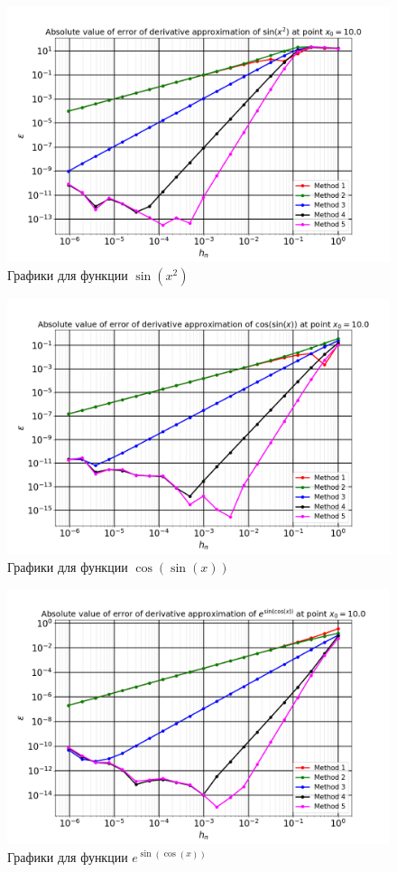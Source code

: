 		\begin{figure}[h!]
			\centering
			\includegraphics[width=\linewidth]{./Pictures/Function_1.png}
			\caption{Графики для функции $\sin(x^2)$}
		\end{figure}
	
		\newpage
		\begin{figure}[h!]
			\centering
			\includegraphics[width=\linewidth]{./Pictures/Function_2.png}
			\caption{Графики для функции $\cos(\sin(x))$}
		\end{figure}
	
		\begin{figure}[h!]
			\centering
			\includegraphics[width=\linewidth]{./Pictures/Function_3.png}
			\caption{Графики для функции $e^{\sin(\cos(x))}$}
		\end{figure}
	
